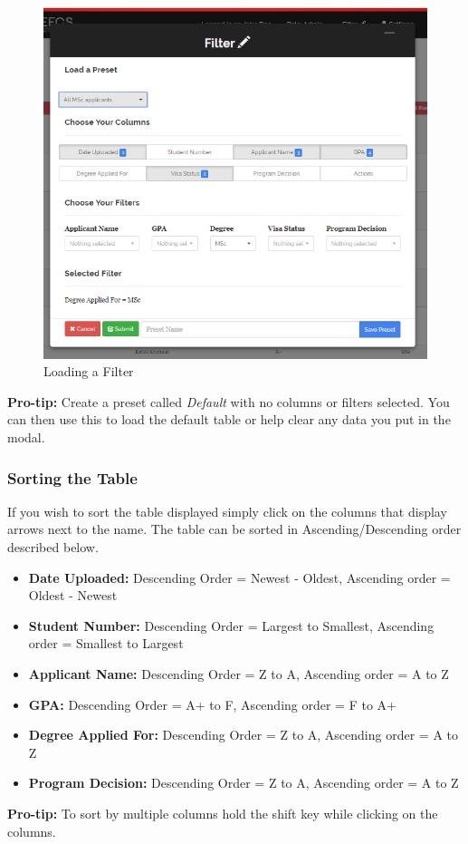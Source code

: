\documentclass[fontsize=12pt,paper=letter,twoside]{scrartcl}
\begin{document}
\begin{enumerate}
\begin{figure}[!htb]
\begin{center}
\includegraphics[width=.99\textwidth]{images/adm/ma/load_preset.png}
\end{center}
\caption{Loading a Filter}
\label{fig:adm/save_filter}
\end{figure}

\smallskip
\noindent \textbf{Pro-tip:} Create a preset called \emph{Default} with no columns or filters selected. You can then use this to load the default table or help clear any data you put in the modal.

\end{enumerate}

\clearpage
\subsubsection{Sorting the Table}
If you wish to sort the table displayed simply click on the columns that display arrows next to the name. The table can be sorted in Ascending/Descending order described below.
\begin{itemize}
\item \textbf{Date Uploaded:} Descending Order = Newest - Oldest, Ascending order = Oldest - Newest
\item \textbf{Student Number:} Descending Order = Largest to Smallest, Ascending order = Smallest to Largest
\item \textbf{Applicant Name:} Descending Order = Z to A, Ascending order = A to Z
\item \textbf{GPA:} Descending Order = A+ to F, Ascending order = F to A+
\item \textbf{Degree Applied For:} Descending Order = Z to A, Ascending order = A to Z
\item \textbf{Program Decision:} Descending Order = Z to A, Ascending order = A to Z
\end{itemize}
\textbf{Pro-tip:} To sort by multiple columns hold the shift key while clicking on the columns.
\end{document}
